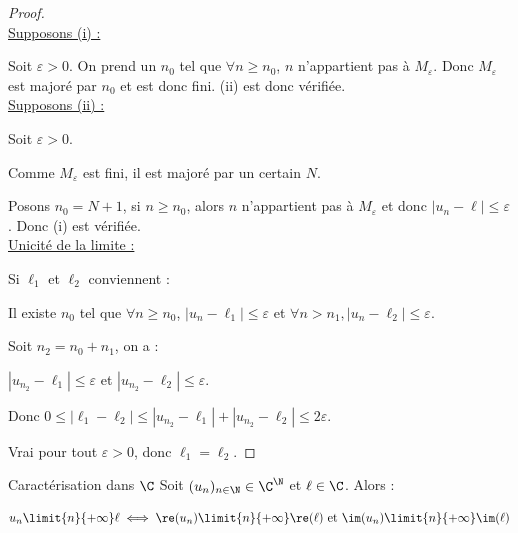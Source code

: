 \begin{proof}~\\
    \uline{Supposons (i) :}

    \vspace{0.2em}Soit $\varepsilon > 0$. On prend un $n_0$ tel que $\forall n \geqslant n_0$, $n$ n'appartient pas 
    à $M_\varepsilon$. Donc $M_\varepsilon$ est majoré par $n_0$ et est donc fini. (ii) est donc vérifiée.\\

    \uline{Supposons (ii) :}

    \vspace{0.2em}Soit $\varepsilon > 0$. 

    Comme $M_\varepsilon$ est fini, il est majoré par un certain $N$. 

    Posons $n_0 = N + 1$, si $n \geqslant n_0$, alors $n$ n'appartient pas à $M_\varepsilon$ et donc
    $|u_n - \ell| \leqslant \varepsilon$. Donc (i) est vérifiée.\\


    \uline{Unicité de la limite :}

    \vspace{0.2em} Si $\ell_1$ et $\ell_2$ conviennent : 

    Il existe $n_0$ tel que $\forall n \geqslant n_0$, $|u_n - \ell_1| \leqslant \varepsilon$ et $\forall n > n_1, |u_n - \ell_2| \leqslant \varepsilon$.

    \vspace{0.2em} Soit $n_2 = n_0 + n_1$, on a :

    $|u_{n_2} - \ell_1| \leqslant \varepsilon$ et $|u_{n_2} - \ell_2| \leqslant \varepsilon$.

    Donc $0 \leqslant |\ell_1 - \ell_2| \leqslant |u_{n_2} - \ell_1| + |u_{n_2} - \ell_2| \leqslant 2\varepsilon$.

    Vrai pour tout $\varepsilon > 0$, donc $\ell_1 = \ell_2$.
\end{proof}


\begin{proposition}{Caractérisation dans $\C$}{}
    Soit $(u_n)_{n \in \N} \in \C^{\N}$ et $\ell \in \C$. Alors : 

    $$u_n \limit{n}{+\infty} \ell \iff \re(u_n) \limit{n}{+\infty} \re(\ell) \text{ et } \im(u_n) \limit{n}{+\infty} \im(\ell)$$
\end{proposition}

